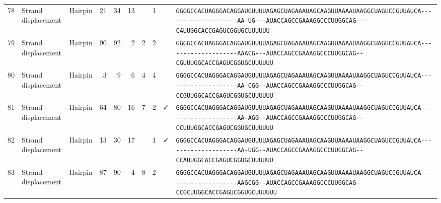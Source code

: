 \begin{tabular}{rllrrrrrcl}
 78 & Strand displacement & Hairpin & 21 & 34 & 13 &  & 1 &  &
 \color{ucsfblack}\verb|GGGGCCACUAGGGACAGGAU|\color{ucsfblue}\verb|GUUUUAGAGCUAGAAAUAGCAAGUUAAAAU|\color{ucsfnavy}\verb|AAGGCUAGUCCGU|\color{ucsfteal}\verb|UAUCA--------------------AA-UG---|\color{ucsfpurple}\verb|AUACCAGCCGAAAGGCCCUUGGCAG|\color{ucsfteal}\verb|---CAUUGGCACCGAGUCGGUGC|\color{ucsfblack}\verb|UUUUUU| \\

 79 & Strand displacement & Hairpin & 90 & 92 & 2 & 2 & 2 &  &
 \color{ucsfblack}\verb|GGGGCCACUAGGGACAGGAU|\color{ucsfblue}\verb|GUUUUAGAGCUAGAAAUAGCAAGUUAAAAU|\color{ucsfnavy}\verb|AAGGCUAGUCCGU|\color{ucsfteal}\verb|UAUCA--------------------AAACG---|\color{ucsfpurple}\verb|AUACCAGCCGAAAGGCCCUUGGCAG|\color{ucsfteal}\verb|--CGUUUGGCACCGAGUCGGUGC|\color{ucsfblack}\verb|UUUUUU| \\

 80 & Strand displacement & Hairpin & 3 & 9 & 6 & 4 & 4 &  &
 \color{ucsfblack}\verb|GGGGCCACUAGGGACAGGAU|\color{ucsfblue}\verb|GUUUUAGAGCUAGAAAUAGCAAGUUAAAAU|\color{ucsfnavy}\verb|AAGGCUAGUCCGU|\color{ucsfteal}\verb|UAUCA--------------------AA-CGG--|\color{ucsfpurple}\verb|AUACCAGCCGAAAGGCCCUUGGCAG|\color{ucsfteal}\verb|--CCGUUGGCACCGAGUCGGUGC|\color{ucsfblack}\verb|UUUUUU| \\

 81 & Strand displacement & Hairpin & 64 & 80 & 16 & 7 & 2 & ✓ &
 \color{ucsfblack}\verb|GGGGCCACUAGGGACAGGAU|\color{ucsfblue}\verb|GUUUUAGAGCUAGAAAUAGCAAGUUAAAAU|\color{ucsfnavy}\verb|AAGGCUAGUCCGU|\color{ucsfteal}\verb|UAUCA--------------------AA-AGG--|\color{ucsfpurple}\verb|AUACCAGCCGAAAGGCCCUUGGCAG|\color{ucsfteal}\verb|--CCUUUGGCACCGAGUCGGUGC|\color{ucsfblack}\verb|UUUUUU| \\

 82 & Strand displacement & Hairpin & 13 & 30 & 17 &  & 1 & ✓ &
 \color{ucsfblack}\verb|GGGGCCACUAGGGACAGGAU|\color{ucsfblue}\verb|GUUUUAGAGCUAGAAAUAGCAAGUUAAAAU|\color{ucsfnavy}\verb|AAGGCUAGUCCGU|\color{ucsfteal}\verb|UAUCA--------------------AA-UGG--|\color{ucsfpurple}\verb|AUACCAGCCGAAAGGCCCUUGGCAG|\color{ucsfteal}\verb|--CCAUUGGCACCGAGUCGGUGC|\color{ucsfblack}\verb|UUUUUU| \\

 83 & Strand displacement & Hairpin & 87 & 90 & 4 & 8 & 2 &  &
 \color{ucsfblack}\verb|GGGGCCACUAGGGACAGGAU|\color{ucsfblue}\verb|GUUUUAGAGCUAGAAAUAGCAAGUUAAAAU|\color{ucsfnavy}\verb|AAGGCUAGUCCGU|\color{ucsfteal}\verb|UAUCA--------------------AAGCGG--|\color{ucsfpurple}\verb|AUACCAGCCGAAAGGCCCUUGGCAG|\color{ucsfteal}\verb|-CCGCUUGGCACCGAGUCGGUGC|\color{ucsfblack}\verb|UUUUUU| \\


\end{tabular}
